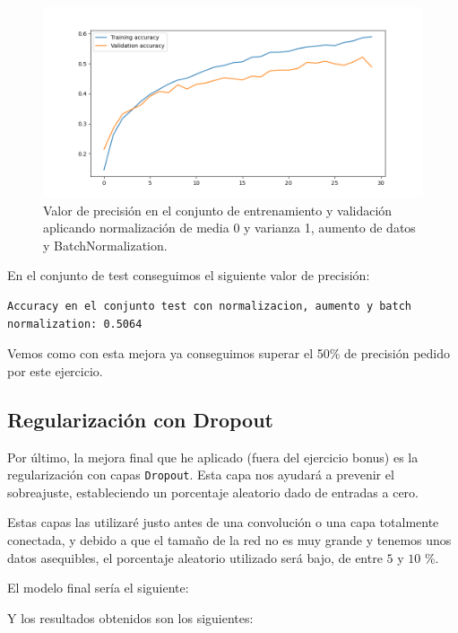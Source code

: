 \documentclass[12pt, spanish]{article}
\begin{document}
\begin{figure}[H]
  \centering
      \includegraphics[width=\textwidth]{1-2-batch-2.png}
 		\caption{Valor de precisión en el conjunto de entrenamiento y validación aplicando normalización de media 0 y varianza 1, aumento de datos y BatchNormalization.}
\end{figure}



En el conjunto de test conseguimos el siguiente valor de precisión:

\begin{lstlisting}
Accuracy en el conjunto test con normalizacion, aumento y batch normalization: 0.5064
\end{lstlisting}

Vemos como con esta mejora ya conseguimos superar el 50\% de precisión pedido por este ejercicio.





\subsection{Regularización con Dropout}

Por último, la mejora final que he aplicado (fuera del ejercicio bonus) es la regularización con capas \texttt{Dropout}\cite{dropout}. Esta capa nos ayudará a prevenir el sobreajuste, estableciendo un porcentaje aleatorio dado de entradas a cero.

Estas capas las utilizaré justo antes de una convolución o una capa totalmente conectada, y debido a que el tamaño de la red no es muy grande y tenemos unos datos asequibles, el porcentaje aleatorio utilizado será bajo, de entre $5$ y $10$ \%.

El modelo final sería el siguiente:



Y los resultados obtenidos son los siguientes:
\end{document}
